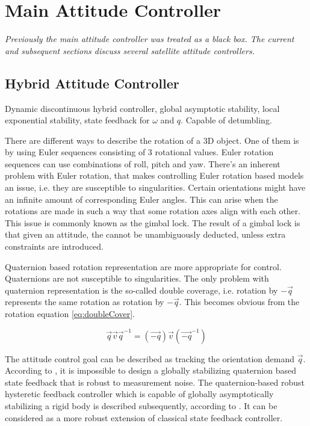 \section{Main Attitude Controller}
\label{sec:mainCont}

\textit{Previously the main attitude controller was treated as a black box. The current and subsequent sections discuss several satellite attitude controllers.}

\subsection{Hybrid Attitude Controller}

Dynamic discontinuous hybrid controller, global asymptotic stability, local exponential stability, state feedback for $\omega$ and $q$. Capable of detumbling. \cite{globalAttController}

There are different ways to describe the rotation of a 3D object. One of them is by using Euler sequences consisting of 3 rotational values. Euler rotation sequences can use combinations of roll, pitch and yaw. There's an inherent problem with Euler rotation, that makes controlling Euler rotation based models an issue, i.e. they are susceptible to singularities. Certain orientations might have an infinite amount of corresponding Euler angles. This can arise when the rotations are made in such a way that some rotation axes align with each other. This issue is commonly known as the gimbal lock. The result of a gimbal lock is that given an attitude, the  cannot be unambiguously deducted, unless extra constraints are introduced.

Quaternion based rotation representation are more appropriate for control. Quaternions are not susceptible to singularities. The only problem with quaternion representation is the so-called double coverage, i.e. rotation by $-\vec{q}$ represents the same rotation as rotation by $-\vec{q}$. This becomes obvious from the rotation equation \ref{eq:doubleCover}.

\begin{equation}
\label{eq:doubleCover}
\vec{q} \vec{v} \vec{q}^{-1} = 	(\vec{-q}) \vec{v} (\vec{-q}^{-1})
\end{equation} 

The attitude control goal can be described as tracking the orientation demand $\vec{q}$. According to \cite{globalAttController}, it is impossible to design a globally stabilizing quaternion based state feedback that is robust to measurement noise. The quaternion-based robust hysteretic feedback controller which is capable of globally asymptotically stabilizing a rigid body is described subsequently, according to \cite{globalAttController}. It can be considered as a more robust extension of classical state feedback controller.


